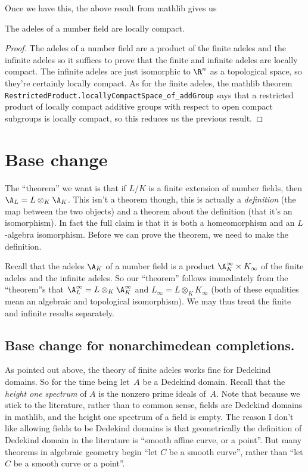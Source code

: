 Once we have this, the above result from mathlib gives us
\begin{theorem}
  \label{NumberField.AdeleRing.locallyCompactSpace}
  \leanok
  The adeles of a number field are locally compact.
\end{theorem}
\begin{proof}
  The adeles of a number field are a product of the finite adeles and the infinite adeles
  so it suffices to prove that the finite and infinite adeles are locally compact.
  The infinite adeles are just isomorphic to $\R^n$ as a topological space, so they're certainly
  locally compact. As for the finite adeles,
  the mathlib theorem {\tt RestrictedProduct.locallyCompactSpace\_of\_addGroup}
  says that a restricted product of locally compact additive groups with respect to open compact
  subgroups is locally compact, so this reduces us the previous result.
\end{proof}

\section{Base change}

The ``theorem'' we want is that if $L/K$ is a finite extension of number fields,
then $\A_L=L\otimes_K\A_K$. This isn't a theorem though, this is actually a \emph{definition}
(the map between the two objects) and a theorem about
the definition (that it's an isomorphism). In fact the full claim is that it is both a homeomorphism
and an $L$-algebra isomorphism. Before we can prove the theorem, we need to make the
definition.

Recall that the adeles $\A_K$ of a number field is a product $\A_K^\infty\times K_\infty$
of the finite adeles and the infinite adeles. So our ``theorem'' follows immediately from
the ``theorem''s that $\A_L^\infty=L\otimes_K\A_K^\infty$ and $L_\infty=L\otimes_KK_\infty$
(both of these equalities mean an algebraic and topological isomorphism).
We may thus treat the finite and infinite results separately.

\subsection{Base change for nonarchimedean completions.}

As pointed out above, the theory of finite adeles works fine for Dedekind domains.
So for the time being let~$A$ be a Dedekind domain. Recall that the \emph{height one spectrum}
of $A$ is the nonzero prime ideals of~$A$. Note that because we stick to the literature,
rather than to common sense, fields are Dedekind domains in mathlib, and the
height one spectrum of a field is empty. The reason I don't like allowing fields
to be Dedekind domains is that geometrically the definition of Dedekind
domain in the literature is ``smooth affine curve, or a point''. But many theorems in algebraic
geometry begin ``let $C$ be a smooth curve'', rather than ``let $C$ be a smooth curve or a point''.


